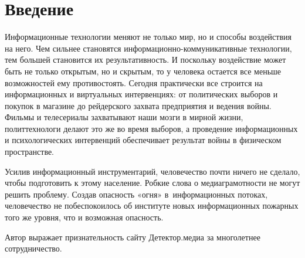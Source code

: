  
 
 
 
 

\section{Введение}

Информационные технологии меняют не только мир, но и способы воздействия на
него. Чем сильнее становятся информационно-коммуникативные технологии, тем
большей становится их результативность. И поскольку воздействие может быть не
только открытым, но и скрытым, то у человека остается все меньше возможностей
ему противостоять. Сегодня практически все строится на информационных и
виртуальных интервенциях: от политических выборов и покупок в магазине до
рейдерского захвата предприятия и ведения войны. Фильмы и телесериалы
захватывают наши мозги в мирной жизни, политтехнологи делают это же во время
выборов, а проведение информационных и психологических интервенций обеспечивает
результат войны в физическом пространстве.

Усилив информационный инструментарий, человечество почти ничего не сделало,
чтобы подготовить к этому население. Робкие слова о медиаграмотности не могут
решить проблему. Создав опасность «огня» в информационных потоках, человечество
не побеспокоилось об институте новых информационных пожарных того же уровня,
что и возможная опасность.

Автор выражает признательность сайту Детектор.медиа  за многолетнее
сотрудничество.
